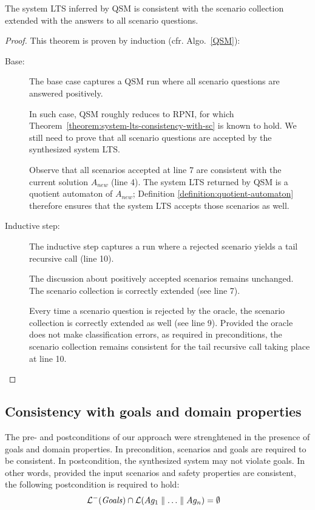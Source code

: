 \begin{theorem}
The system LTS inferred by QSM is consistent with the scenario collection extended with the answers to all scenario questions.

\begin{proof}
This theorem is proven by induction (cfr. Algo.~\ref{QSM}):
\begin{description}
\item[Base:] The base case captures a QSM run where all scenario questions are answered positively. 

In such case, QSM roughly reduces to RPNI, for which Theorem~\ref{theorem:system-lts-consistency-with-sc} is known to hold. We still need to prove that all scenario questions are accepted by the synthesized system LTS. 

Observe that all scenarios accepted at line 7 are consistent with the current solution $A_{new}$ (line 4). The system LTS returned by QSM is a quotient automaton of $A_{new}$; Definition \ref{definition:quotient-automaton} therefore ensures that the system LTS accepts those scenarios as well.

\item[Inductive step:] The inductive step captures a run where a rejected scenario yields a tail recursive call (line 10).

The discussion about positively accepted scenarios remains unchanged. The scenario collection is correctly extended (see line 7).

Every time a scenario question is rejected by the oracle, the scenario collection is correctly extended as well (see line 9). Provided the oracle does not make classification errors, as required in preconditions, the scenario collection remains consistent for the tail recursive call taking place at line 10.
\end{description}
\end{proof}
\end{theorem}


\subsection{Consistency with goals and domain properties\label{subsection:proof-with-domain-knowledge}}

The pre- and postconditions of our approach were strenghtened in the presence of goals and domain properties. In precondition, scenarios and goals are required to be consistent. In postcondition, the synthesized system may not violate goals. In other words, provided the input scenarios and safety properties are consistent, the following postcondition is required to hold:
\begin{align}
&\mathcal{L}^-(\mbox{\emph{Goals}}) \cap \mathcal{L}(Ag_1 \parallel \ldots \parallel Ag_n) = \emptyset \label{consistency-of-system-lts-with-goals}
\end{align}

